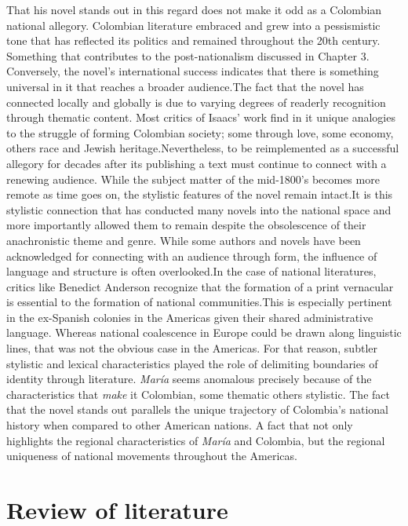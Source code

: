 \documentclass[12pt]{report}\usepackage[]{graphicx}\usepackage[]{color}
\begin{document}
\begin{spacing}{1.9}
That his novel stands out in this regard does not make it odd as a Colombian national allegory. 
Colombian literature embraced and grew into a pessismistic tone that has reflected its politics and remained throughout the 20th century.
Something that contributes to the post-nationalism discussed in Chapter 3.
Conversely, the novel's international success indicates that there is something universal in it that reaches a broader audience.The fact that the novel has connected locally and globally is due to varying degrees of readerly recognition through thematic content.
Most critics of Isaacs' work find in it unique analogies to the struggle of forming Colombian society; some through love, some economy, others race and Jewish heritage.Nevertheless, to be reimplemented as a successful allegory for decades after its publishing a text must continue to connect with a renewing audience.
While the subject matter of the mid-1800's becomes more remote as time goes on, the stylistic features of the novel remain intact.It is this stylistic connection that has conducted many novels into the national space and more importantly allowed them to remain despite the obsolescence of their anachronistic theme and genre.
While some authors and novels have been acknowledged for connecting with an audience through form, the influence of language and structure is often overlooked.In the case of national literatures, critics like Benedict Anderson recognize that the formation of a print vernacular is essential to the formation of national communities.This is especially pertinent in the ex-Spanish colonies in the Americas given their shared administrative language. 
Whereas national coalescence in Europe could be drawn along linguistic lines, that was not the obvious case in the Americas. For that reason, subtler stylistic and lexical characteristics played the role of delimiting boundaries of identity through literature. 
\textit{María} seems anomalous precisely because of the characteristics that \textit{make} it Colombian, some thematic others stylistic.
The fact that the novel stands out parallels the unique trajectory of Colombia's national history when compared to other American nations. 
A fact that not only highlights the regional characteristics of \textit{María} and Colombia, but the regional uniqueness of national movements throughout the Americas.


\section{Review of literature}

\end{spacing}
\end{document}
